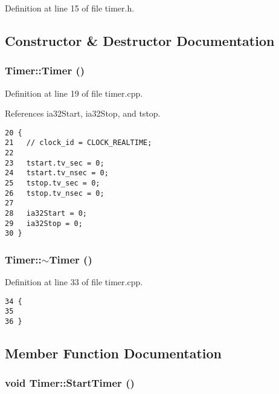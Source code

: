 Definition at line 15 of file timer.h.

\subsection{Constructor \& Destructor Documentation}
\subsubsection{\setlength{\rightskip}{0pt plus 5cm}Timer::Timer ()}\label{classTimer_5f16e8da27d2a5a5242dead46de05d97}




Definition at line 19 of file timer.cpp.

References ia32Start, ia32Stop, and tstop.

\begin{Code}\begin{verbatim}20 {
21   // clock_id = CLOCK_REALTIME;
22       
23   tstart.tv_sec = 0;
24   tstart.tv_nsec = 0;
25   tstop.tv_sec = 0;
26   tstop.tv_nsec = 0;
27   
28   ia32Start = 0;
29   ia32Stop = 0;
30 }
\end{verbatim}
\end{Code}


\subsubsection{\setlength{\rightskip}{0pt plus 5cm}Timer::$\sim$Timer ()}\label{classTimer_14fa469c4c295c5fa6e66a4ad1092146}




Definition at line 33 of file timer.cpp.

\begin{Code}\begin{verbatim}34 {
35   
36 }
\end{verbatim}
\end{Code}




\subsection{Member Function Documentation}
\subsubsection{\setlength{\rightskip}{0pt plus 5cm}void Timer::StartTimer ()}\label{classTimer_49838bb0d401f745ce6756a7fc5882e3}




